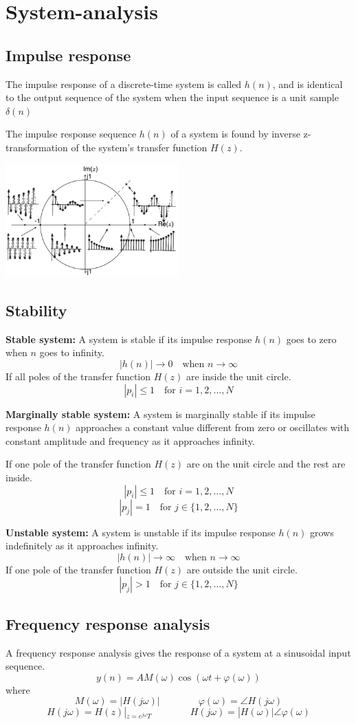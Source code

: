 \section{System-analysis}
\subsection{Impulse response}
The impulse response of a discrete-time system is called $h(n)$, and is identical to the output sequence of the system when the input sequence is a unit sample $\delta(n)$

The impulse response sequence $h(n)$ of a system is found by inverse z-transformation of the system's transfer function $H(z)$.

\begin{center}
  \includegraphics[width=0.5\textwidth]{Images/Impluse-response.png}
\end{center}
\subsection{Stability}
\textbf{Stable system:} A system is stable if its impulse response $h(n)$ goes to zero when $n$ goes to infinity.
$$|h(n)|\to 0 \quad\text{when }n\to \infty$$
If all poles of the transfer function $H(z)$ are inside the unit circle.
$$|p_i|\leq 1\quad\text{for }i=1,2,\dots,N$$

\textbf{Marginally stable system:} A system is marginally stable if its impulse response $h(n)$ approaches a constant value different from zero or oscillates with constant amplitude and frequency as it approaches infinity.

If one pole of the transfer function $H(z)$ are on the unit circle and the rest are inside.
$$|p_i|\leq 1\quad\text{for }i=1,2,\dots,N$$
$$|p_j|= 1\quad\text{for }j\in\{1,2,\dots,N\}$$

\textbf{Unstable system:} A system is unstable if its impulse response $h(n)$ grows indefinitely as it approaches infinity.
$$|h(n)|\to \infty \quad\text{when }n\to \infty$$
If one pole of the transfer function $H(z)$ are outside the unit circle.
$$|p_j|> 1\quad\text{for }j\in\{1,2,\dots,N\}$$

\subsection{Frequency response analysis}
A frequency response analysis gives the response of a system at a sinusoidal input sequence.
$$y(n)=AM(\omega)\cos(\omega t+\varphi(\omega))$$
where
$$M(\omega)=|H(j\omega)| \qquad \qquad\varphi(\omega)=\angle H(j\omega)$$
$$H(j\omega)=H(z)|_{z=e^{j\omega}T}\qquad\qquad H(j\omega)=|H(\omega)|\angle\varphi(\omega)$$
